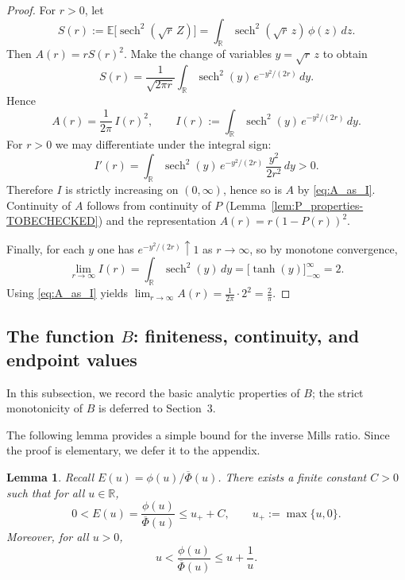 \documentclass[11pt]{article}
\newtheorem{lemma}[theorem]{Lemma}
\begin{document}
\begin{proof}
For $r>0$, let
\[
S(r):=\mathbb E\big[\operatorname{sech}^2(\sqrt{r}\,Z)\big]
=\int_{\mathbb R}\operatorname{sech}^2(\sqrt{r}\,z)\,\phi(z)\,dz.
\]
Then $A(r)=rS(r)^2$. Make the change of variables $y=\sqrt{r}\,z$ to obtain
\[
S(r)=\frac{1}{\sqrt{2\pi r}}\int_{\mathbb R}\operatorname{sech}^2(y)\,e^{-y^2/(2r)}\,dy.
\]
Hence
\begin{equation}\label{eq:A_as_I}
A(r)=\frac{1}{2\pi}\,I(r)^2,
\qquad
I(r):=\int_{\mathbb R}\operatorname{sech}^2(y)\,e^{-y^2/(2r)}\,dy.
\end{equation}
For $r>0$ we may differentiate under the integral sign:
\[
I'(r)=\int_{\mathbb R}\operatorname{sech}^2(y)\,e^{-y^2/(2r)}\,\frac{y^2}{2r^2}\,dy>0.
\]
Therefore $I$ is strictly increasing on $(0,\infty)$, hence so is $A$ by \eqref{eq:A_as_I}. Continuity of $A$ follows from continuity of $P$ (Lemma~\ref{lem:P_properties-TOBECHECKED}) and the representation $A(r)=r(1-P(r))^2$.


Finally, for each $y$ one has $e^{-y^2/(2r)}\uparrow 1$ as $r\to\infty$, so by monotone convergence,
\[
\lim_{r\to\infty}I(r)=\int_{\mathbb R}\operatorname{sech}^2(y)\,dy
=\bigl[\tanh(y)\bigr]_{-\infty}^{\infty}=2.
\]
Using \eqref{eq:A_as_I} yields $\lim_{r\to\infty}A(r)=\frac{1}{2\pi}\cdot 2^2=\frac{2}{\pi}$.
\end{proof}

\subsection{The function $B$: finiteness, continuity, and endpoint values}
In this subsection, we record the basic analytic properties of $B$; the strict monotonicity of $B$ is deferred to Section~3.

The following lemma provides a simple bound for the inverse Mills ratio. Since the proof is elementary, we defer it to the appendix.
\begin{lemma}\label{lem:Mills_bound-TOBECHECKED}
Recall $E(u)=\phi(u)/\overline{\Phi}(u)$. There exists a finite constant $C>0$ such that for all
$u\in\mathbb R$,
\[
0<E(u)=\frac{\phi(u)}{\overline{\Phi}(u)} \le u_+ + C,\qquad u_+:=\max\{u,0\}.
\]
Moreover, for all $u>0$,
\[
u<\frac{\phi(u)}{\overline{\Phi}(u)}\le u+\frac{1}{u}.
\]
\end{lemma}
\end{document}
